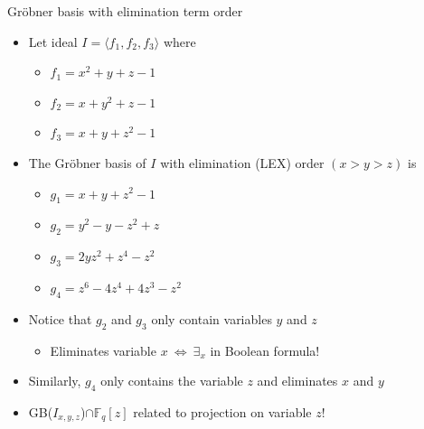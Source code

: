 \documentclass[xcolor=dvipsnames]{beamer}
\newcommand{\Fq}{{\mathbb{F}}_{q}}
\newcommand{\Grobner}{Gr\"{o}bner\xspace}
\begin{document}
\begin{frame}{\large{Gr\"obner basis with elimination term order}}
\begin{itemize}
\item Let ideal $I = \langle f_1, f_2, f_3 \rangle$ where
	\begin{itemize}
	\item $f_1 = x^2 + y + z - 1$
	\item $f_2 = x + y^2 + z - 1$
	\item $f_3 = x + y + z^2 - 1$
	\end{itemize}
\item The \Grobner basis of $I$ with \alert{elimination} (LEX) order $(x > y > z)$ is
	\begin{itemize}
	\item $g_1 = x + y + z^2 - 1$
	\item $g_2 = y^2 - y - z^2 + z$
	\item $g_3 = 2yz^2 + z^4 - z^2$
	\item $g_4 = z^6 - 4z^4 + 4z^3 - z^2$
	\end{itemize}
\item Notice that $g_2$ and $g_3$ only contain variables $y$ and $z$
	\begin{itemize}
	\item Eliminates variable $x~\Leftrightarrow  ~\exists_x$ in Boolean formula!
	\end{itemize}
\item Similarly, $g_4$ only contains the variable $z$ and eliminates $x$ and $y$
\pause
\item GB($I_{x,y,z}$)$\cap\Fq[z]$ related to \alert{projection} on variable $z$!
\end{itemize}
\end{frame}
\end{document}
